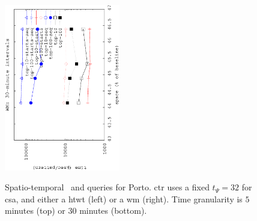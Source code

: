 \begin{figure}[!ht]
\begin{center}
			{\includegraphics[angle=-90,width=0.45\textwidth]{figures_synt/porto_st_topk_wm_30.eps}}
			
		\end{center}
		\vspace{-0.3cm}
		\caption{Spatio-temporal {\Stk\ and \Stks} queries for Porto. \acrlong{ctr} uses a fixed $t_{\Psi}=32$ for \acrlong{csa}, 
			and either a \acrlong{htwt} (left) or a \acrlong{wm} (right). 
			Time granularity is $5$ minutes (top) or $30$ minutes (bottom). 
		}
		\label{fig:portost.tk}
		\vspace{-0.3cm}
	\end{figure}






